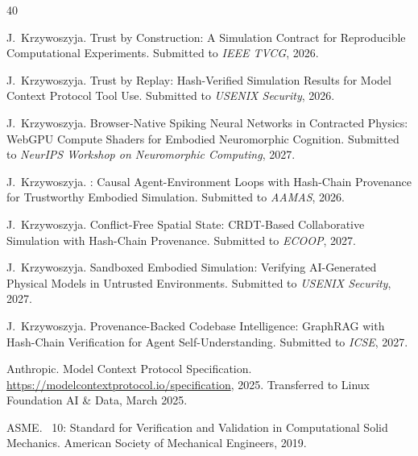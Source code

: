 \documentclass[sigchi-a]{acmart}
\begin{document}
\iffalse
\begin{thebibliography}{40}


J.~Krzywoszyja.
\newblock Trust by Construction: A Simulation Contract for Reproducible
  Computational Experiments.
\newblock Submitted to \emph{IEEE TVCG}, 2026.

J.~Krzywoszyja.
\newblock Trust by Replay: Hash-Verified Simulation Results for Model
  Context Protocol Tool Use.
\newblock Submitted to \emph{USENIX Security}, 2026.

J.~Krzywoszyja.
\newblock Browser-Native Spiking Neural Networks in Contracted Physics:
  WebGPU Compute Shaders for Embodied Neuromorphic Cognition.
\newblock Submitted to \emph{NeurIPS Workshop on Neuromorphic Computing}, 2027.

J.~Krzywoszyja.
: Causal Agent-Environment Loops with Hash-Chain Provenance
  for Trustworthy Embodied Simulation.
\newblock Submitted to \emph{AAMAS}, 2026.

J.~Krzywoszyja.
\newblock Conflict-Free Spatial State: {CRDT}-Based Collaborative Simulation
  with Hash-Chain Provenance.
\newblock Submitted to \emph{ECOOP}, 2027.

J.~Krzywoszyja.
\newblock Sandboxed Embodied Simulation: Verifying {AI}-Generated Physical
  Models in Untrusted Environments.
\newblock Submitted to \emph{USENIX Security}, 2027.

J.~Krzywoszyja.
\newblock Provenance-Backed Codebase Intelligence: {GraphRAG} with Hash-Chain
  Verification for Agent Self-Understanding.
\newblock Submitted to \emph{ICSE}, 2027.


Anthropic.
\newblock Model Context Protocol Specification.
\newblock \url{https://modelcontextprotocol.io/specification}, 2025.
\newblock Transferred to Linux Foundation AI \& Data, March 2025.

{ASME}.
~10: Standard for Verification and Validation in
  Computational Solid Mechanics.
\newblock American Society of Mechanical Engineers, 2019.


\end{thebibliography}
\end{document}
